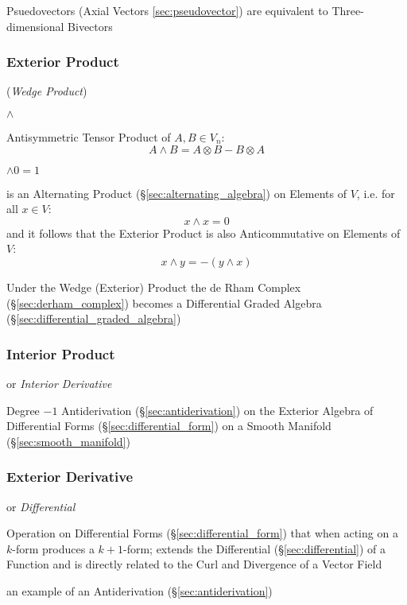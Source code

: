 Psuedovectors (Axial Vectors \ref{sec:pseudovector}) are equivalent to
Three-dimensional Bivectors



\subsubsection{Exterior Product}\label{sec:exterior_product}

(\emph{Wedge Product})

$\wedge$

Antisymmetric Tensor Product of $A, B \in V_n$:
\[
  A \wedge B = A \otimes B - B \otimes A
\]

$\wedge 0 = 1$

is an Alternating Product (\S\ref{sec:alternating_algebra}) on Elements of $V$,
i.e. for all $x \in V$:
\[
  x \wedge x = 0
\]
and it follows that the Exterior Product is also Anticommutative on Elements of
$V$:
\[
  x \wedge y = -(y \wedge x)
\]

Under the Wedge (Exterior) Product the de Rham Complex
(\S\ref{sec:derham_complex}) becomes a Differential Graded Algebra
(\S\ref{sec:differential_graded_algebra})



\subsubsection{Interior Product}\label{sec:interior_product}

or \emph{Interior Derivative}

Degree $-1$ Antiderivation (\S\ref{sec:antiderivation}) on the Exterior Algebra
of Differential Forms (\S\ref{sec:differential_form}) on a Smooth Manifold
(\S\ref{sec:smooth_manifold})




\subsubsection{Exterior Derivative}\label{sec:exterior_derivative}\hfill

or \emph{Differential}

Operation on Differential Forms (\S\ref{sec:differential_form}) that when acting
on a $k$-form produces a $k+1$-form; extends the Differential
(\S\ref{sec:differential}) of a Function and is directly related to the Curl and
Divergence of a Vector Field

an example of an Antiderivation (\S\ref{sec:antiderivation})

